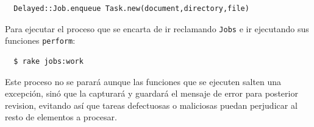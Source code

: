 \begin{verbatim}
  Delayed::Job.enqueue Task.new(document,directory,file)
\end{verbatim}

Para ejecutar el proceso que se encarta de ir reclamando \texttt{Jobs} e ir ejecutando sus funciones \texttt{perform}:

\begin{verbatim}
  $ rake jobs:work
\end{verbatim}

Este proceso no se parará aunque las funciones que se ejecuten salten una excepción, sinó que la capturará y guardará el mensaje de error para posterior revision, evitando así que tareas defectuosas o maliciosas puedan perjudicar al resto de elementos a procesar.


